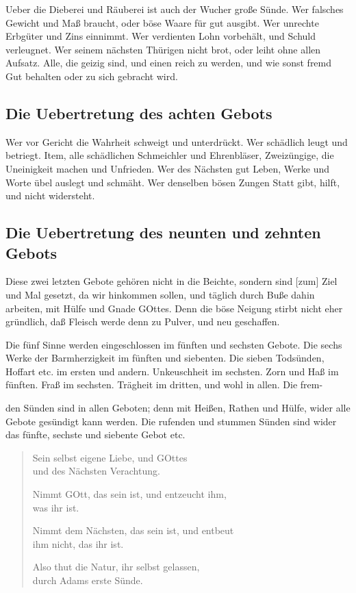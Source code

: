 Ueber die Dieberei und Räuberei ist auch der Wucher große Sünde. Wer falsches Gewicht und Maß braucht, oder böse Waare für gut ausgibt. Wer unrechte Erbgüter und Zins einnimmt. Wer verdienten Lohn vorbehält, und Schuld verleugnet. Wer seinem nächsten Thürigen nicht brot, oder leiht ohne allen Aufsatz. Alle, die geizig sind, und einen reich zu werden, und wie sonst fremd Gut behalten oder zu sich gebracht wird.

\subsection{Die Uebertretung des achten Gebots}

Wer vor Gericht die Wahrheit schweigt und unterdrückt. Wer schädlich leugt und betriegt. Item, alle schädlichen Schmeichler und Ehrenbläser, Zweizüngige, die Uneinigkeit machen und Unfrieden. Wer des Nächsten gut Leben, Werke und Worte übel auslegt und schmäht. Wer denselben bösen Zungen Statt gibt, hilft, und nicht widersteht.

\subsection{Die Uebertretung des neunten und zehnten Gebots}

Diese zwei letzten Gebote gehören nicht in die Beichte, sondern sind [zum] Ziel und Mal gesetzt, da wir hinkommen sollen, und täglich durch Buße dahin arbeiten, mit Hülfe und Gnade GOttes. Denn die böse Neigung stirbt nicht eher gründlich, daß Fleisch werde denn zu Pulver, und neu geschaffen.

Die fünf Sinne werden eingeschlossen im fünften und sechsten Gebote. Die sechs Werke der Barmherzigkeit im fünften und siebenten. Die sieben Todsünden, Hoffart etc. im ersten und andern. Unkeuschheit im sechsten. Zorn und Haß im fünften. Fraß im sechsten. Trägheit im dritten, und wohl in allen. Die frem-

den Sünden sind in allen Geboten; denn mit Heißen, Rathen und Hülfe, wider alle Gebote gesündigt kann werden. Die rufenden und stummen Sünden sind wider das fünfte, sechste und siebente Gebot etc.

\begin{verse}
Sein selbst eigene Liebe, und GOttes\\
und des Nächsten Verachtung.

Nimmt GOtt, das sein ist, und entzeucht ihm,\\
was ihr ist.

Nimmt dem Nächsten, das sein ist, und entbeut\\
ihm nicht, das ihr ist.

Also thut die Natur, ihr selbst gelassen,\\
durch Adams erste Sünde.
\end{verse}

